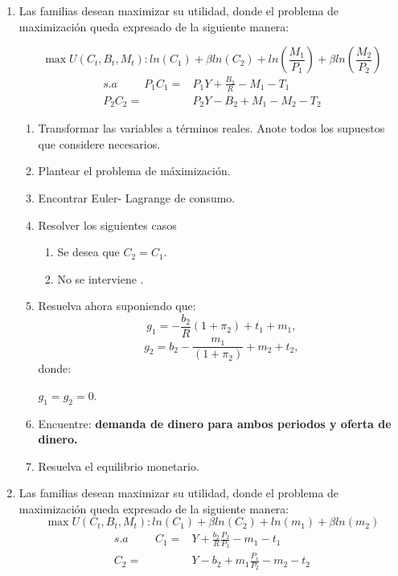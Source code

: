 \documentclass[a4paper,12pt]{article}
\begin{document}
\begin{enumerate} 
\item Las familias desean maximizar su utilidad, donde el problema de maximización queda expresado de la siguiente manera:  

\begin{equation*}
\max U(C_t,B_t, M_t): ln(C_1)+ \beta ln(C_2) + ln \left(\frac{M_1}{P_1}\right)+\beta ln \left(\frac{M_2}{P_2}\right)
\end{equation*}
\begin{align*}
    s.a \hspace{1cm} P_1 C_1=&P_1 Y + \frac{B_2}{R}- M_1 - T_1\\
     P_2 C_2=&P_2 Y - B_2 + M_1 - M_2 - T_2
\end{align*}

\begin{enumerate}[label=\alph*)]
\item Transformar las variables a términos reales. Anote todos los supuestos que considere necesarios.
\item Plantear el problema de máximización. 
\item Encontrar Euler- Lagrange de consumo.
\item Resolver los siguientes casos
\begin{enumerate}[label=\alph*.\arabic*)]
        \item Se desea que $C_2=C_1$.
        \item No se interviene .
 \end{enumerate}
 
\item Resuelva ahora suponiendo que: 
\begin{equation*}
    g_1= - \frac{b_2}{R}(1+\pi_2) + t_1 + m_1,
\end{equation*}
\begin{equation*}
        g_2= b_2- \frac{m_1}{(1+\pi_2)}  + m_2 + t_2,
\end{equation*}
donde: 

$g_1=g_2=0$.

\item Encuentre: \textbf{demanda de dinero para ambos periodos y oferta de dinero.}
\item Resuelva el equilibrio monetario.
\end{enumerate}




 
\item Las familias desean maximizar su utilidad, donde el problema de maximización queda expresado de la siguiente manera:  
\begin{equation*}
\max U(C_t,B_t, M_t): ln(C_1)+ \beta ln(C_2) + ln \left(m_1\right)+\beta ln \left(m_2\right)
\end{equation*}
\begin{align*}
    s.a \hspace{1cm} C_1=&Y + \frac{b_2}{R}\frac{P_2}{P_1}- m_1 - t_1\\
      C_2=& Y - b_2 + m_1\frac{P_1}{P_2} - m_2 - t_2
\end{align*}



\end{enumerate}
\end{document}
